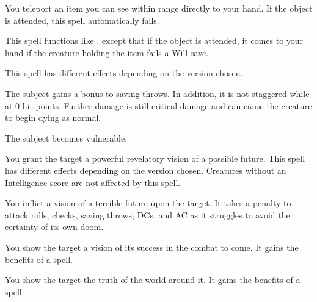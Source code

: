 \spellrng{\rngclose}
\begin{spelleffect}
  You teleport an item you can see within range directly to your hand. If the object is attended, this spell automatically fails.
\end{spelleffect}

\spellrng{\rngmed}
\begin{spelleffect}
  This spell functions like , except that if the object is attended, it comes to your hand if the creature holding the item fails a Will save.
\end{spelleffect}

\spellrng{\rngmed}
\spelldur{\durshort}
\begin{spelleffect}
    This spell has different effects depending on the version chosen.
    \par {} The subject gains a  bonus to saving throws. In addition, it is not staggered while at 0 hit points. Further damage is still critical damage and can cause the creature to begin dying as normal. 
    \par {} The subject becomes vulnerable.
\end{spelleffect}
\begin{spellnotes}
  \vulnerableexplanation
\end{spellnotes}

\spellrng{\rngmed}
\spelldur{\durshort}
\begin{spelleffect}
  You grant the target a powerful revelatory vision of a possible future. This spell has different effects depending on the version chosen. Creatures without an Intelligence score are not affected by this spell.
  \par {} You inflict a vision of a terrible future upon the target. It takes a  penalty to attack rolls, checks, saving throws, DCs, and AC as it struggles to avoid the certainty of its own doom.
  \par {} You show the target a vision of its success in the combat to come. It gains the benefits of a  spell.
  \par {} You show the target the truth of the world around it. It gains the benefits of a  spell.
\end{spelleffect}

